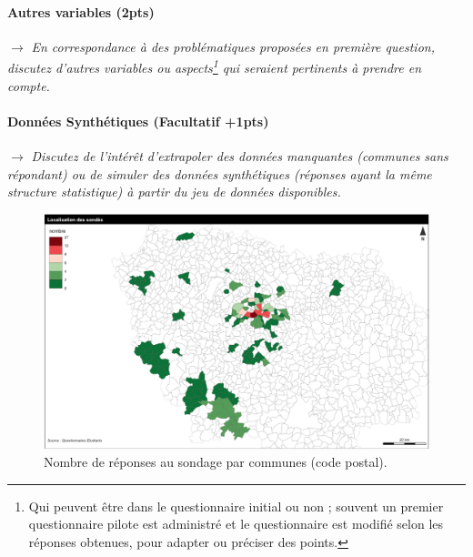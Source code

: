 


\paragraph{Autres variables (2pts)}

$\rightarrow$ \textit{En correspondance à des problématiques proposées en première question, discutez d'autres variables ou aspects\footnote{Qui peuvent être dans le questionnaire initial ou non ; souvent un premier questionnaire pilote est administré et le questionnaire est modifié selon les réponses obtenues, pour adapter ou préciser des points.} qui seraient pertinents à prendre en compte.}


\paragraph{Données Synthétiques (Facultatif +1pts)}

$\rightarrow$ \textit{Discutez de l'intérêt d'extrapoler des données manquantes (communes sans répondant) ou de simuler des données synthétiques (réponses ayant la même structure statistique) à partir du jeu de données disponibles.}



\begin{figure}
\centering
\includegraphics[width=\textwidth,height=0.45\textheight]{maps/count2}
\caption{Nombre de réponses au sondage par communes (code postal).}
\end{figure}


